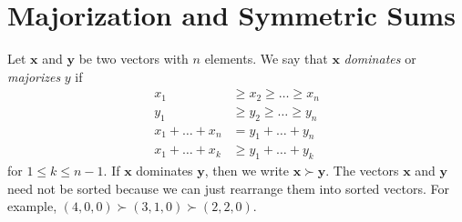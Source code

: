 \documentclass{subfile}
\begin{document}
	\section{Majorization and Symmetric Sums}\label{sec:mazorization}
	
	Let $\mathbf{x}$ and $\mathbf{y}$ be two vectors with $n$ elements. We say that $\mathbf{x}$ \textit{dominates} or \textit{majorizes} $y$ if
		\begin{align*}
			x_{1}
				& \geq x_{2}\geq \ldots\geq x_{n}\\
			y_{1}
				& \geq y_{2}\geq \ldots\geq y_{n}\\
			x_{1}+\ldots+x_{n}
				& = y_{1}+\ldots+y_{n}\\
			x_{1}+\ldots+x_{k}
				& \geq y_{1}+\ldots+y_{k}
		\end{align*}
	for $1\leq k\leq n-1$. If $\mathbf{x}$ dominates $\mathbf{y}$, then we write $\mathbf{x}\succ\mathbf{y}$. The vectors $\mathbf{x}$ and $\mathbf{y}$ need not be sorted because we can just rearrange them into sorted vectors. For example, $(4,0,0)\succ(3,1,0)\succ(2,2,0)$.
	
\end{document}
